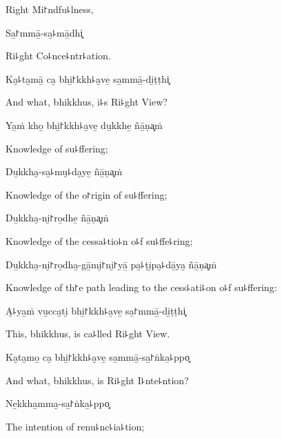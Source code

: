 \begin{english}
  Right Mi꜓ndfu꜕lness,
\end{english}

Sa̱꜓mmā̱-sa̮꜕mā̱dhi͓

\begin{english}
  Ri꜕ght Co꜕nce꜕ntr꜕ation.
\end{english}

Ka̮꜕ta̮mā̱ ca̮ bhi̱꜓kkh꜕a̮ve̱ sa̱mmā̱-di̱ṭṭhi͓

\begin{english}
  And what, bhikkhus, i꜕s Ri꜕ght View?
\end{english}

Ya̱ṁ kho̱ bhi̱꜓kkh꜕a̮ve̱ du̱kkhe̱ ñā̱ṇa͓ṁ

\begin{english}
  Knowledge of su꜕ffering;
\end{english}

Du̱kkha̮-sa̮꜕mu̮꜕da̮ye̱ ñā̱ṇa͓ṁ

\begin{english}
  Knowledge of the o꜓rigin of su꜕ffering;
\end{english}

Du̱kkha̮-ni̮꜓ro̱dhe̱ ñā̱ṇa͓ṁ

\begin{english}
  Knowledge of the cessa꜕tio꜕n o꜕f su꜕ffe꜕ring;
\end{english}

Du̱kkha̮-ni̮꜓ro̱dha̮-gā̱mi̮꜓ni̮꜓yā̱ pa̮꜕ṭi̮pa̮꜕dā̱ya̮ ñā̱ṇa͓ṁ

\begin{english}
  Knowledge of th꜓e path leading to the cess꜕ati꜕on o꜕f su꜕ffering:
\end{english}

A̮꜕ya̱ṁ vu̱cca̮ti̮ bhi̱꜓kkh꜕a̮ve̱ sa̱꜓mmā̱-di̱ṭṭhi͓

\begin{english}
  This, bhikkhus, is ca꜕lled Ri꜕ght View.
\end{english}

Ka̮ta̮mo̱ ca̮ bhi̱꜓kkh꜕a̮ve̱ sa̱mmā̱-sa̱꜓ṅka̱꜕ppo͓

\begin{english}
  And what, bhikkhus, is Ri꜕ght I꜕nte꜕ntion?
\end{english}

\ifaivedition
\clearpage
\fi

Ne̱kkha̱mma̮-sa̱꜓ṅka̱꜕ppo͓

\begin{english}
  The intention of renu꜕nc꜕ia꜕tion;
\end{english}

